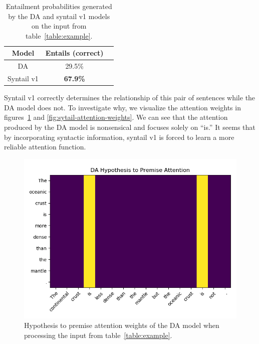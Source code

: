 \documentclass[11pt,a4paper]{article}
\begin{document}
\begin{table}[h]
    \centering
    \begin{tabular}{c c c}
        \toprule
         Model & Entails (correct) \\
         \midrule
         DA & 29.5\% \\
         Syntail v1 & \textbf{67.9\%} \\
         \bottomrule
    \end{tabular}
    \caption{Entailment probabilities generated by the DA and syntail v1 models on the input
             from table~\ref{table:example}.}
\label{table:pred-example}
\end{table}

Syntail v1 correctly determines the relationship of this pair of sentences
while the DA model does not.
To investigate why, we visualize the attention weights in figures~\ref{fig:da-attention-weights}
and \ref{fig:sytail-attention-weights}.
We can see that the attention produced by the DA model is nonsensical and focuses solely on
``is.'' It seems that by incorporating syntactic information, syntail v1 is forced to learn
a more reliable attention function.

\begin{figure}[h]
    \centering
    \includegraphics[width=\linewidth]{figures/da-h2p-attention.png}
    \caption{Hypothesis to premise attention weights of the DA model when processing
             the input from table~\ref{table:example}.}
    \label{fig:da-attention-weights}
\end{figure}
\end{document}

